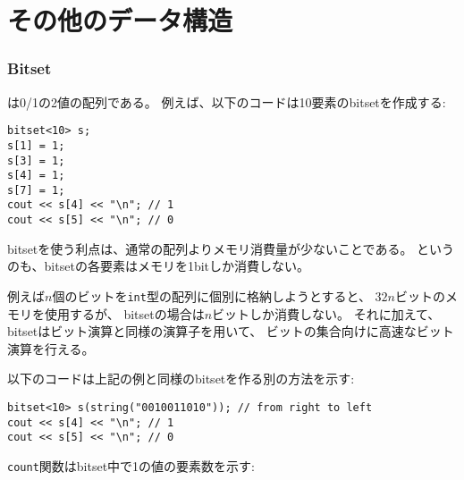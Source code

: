 \section{その他のデータ構造}

\subsubsection{Bitset}


は0/1の2値の配列である。
例えば、以下のコードは10要素のbitsetを作成する:
\begin{lstlisting}
bitset<10> s;
s[1] = 1;
s[3] = 1;
s[4] = 1;
s[7] = 1;
cout << s[4] << "\n"; // 1
cout << s[5] << "\n"; // 0
\end{lstlisting}

\begin{comment}
The benefit of using bitsets is that
they require less memory than ordinary arrays,
because each element in a bitset only
uses one bit of memory.
For example, 
if $n$ bits are stored in an \texttt{int} array,
$32n$ bits of memory will be used,
but a corresponding bitset only requires $n$ bits of memory.
In addition, the values of a bitset
can be efficiently manipulated using
bit operators, which makes it possible to
optimize algorithms using bit sets.

The following code shows another way to create the above bitset:
\end{comment}

bitsetを使う利点は、通常の配列よりメモリ消費量が少ないことである。
というのも、bitsetの各要素はメモリを1bitしか消費しない。

例えば$n$個のビットを\texttt{int}型の配列に個別に格納しようとすると、
$32n$ビットのメモリを使用するが、
bitsetの場合は$n$ビットしか消費しない。
それに加えて、bitsetはビット演算と同様の演算子を用いて、
ビットの集合向けに高速なビット演算を行える。

以下のコードは上記の例と同様のbitsetを作る別の方法を示す:
\begin{lstlisting}
bitset<10> s(string("0010011010")); // from right to left
cout << s[4] << "\n"; // 1
cout << s[5] << "\n"; // 0
\end{lstlisting}

\begin{comment}
The function \texttt{count} returns the number
of ones in the bitset:
\end{comment}

\texttt{count}関数はbitset中で1の値の要素数を示す:

